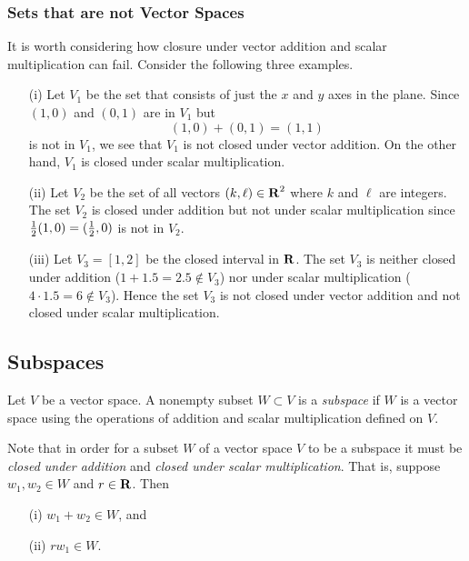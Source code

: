 \documentclass{ximera}
\begin{document}
\subsubsection*{Sets that are not Vector Spaces}

It is worth considering how closure under vector addition and
scalar multiplication can fail.  Consider the following three
examples.

\begin{enumerate}
\item[(i)] Let $V_1$ be the set that consists of just the $x$
and $y$ axes in the plane.  Since $(1,0)$ and $(0,1)$ are in
$V_1$ but
\[
(1,0) + (0,1) = (1,1)
\]
is not in $V_1$, we see that $V_1$ is not closed under vector
addition. On the other hand, $V_1$ is closed under scalar
multiplication.  


\item[(ii)] Let $V_2$ be the set of all vectors $(k,\ell)\in\mbox{$\bf{R}$}^2$
where $k$ and $\ell$ are integers.  The set $V_2$ is closed under
addition but not under scalar multiplication since
$\mbox{$\frac{1}{2}$}(1,0)=(\mbox{$\frac{1}{2}$},0)$ is not in $V_2$.

\item[(iii)] Let $V_3=[1,2]$ be the closed interval in $\mbox{$\bf{R}$}$. The
set $V_3$ is neither closed under addition ($1+1.5=2.5\not\in
V_3$) nor under scalar multiplication ($4\cdot 1.5 = 6\not\in
V_3$).  Hence the set $V_3$ is not closed under vector addition
and not closed under scalar multiplication.
\end{enumerate}

\subsection*{Subspaces}

\begin{Def} \label{subspaces}
Let $V$ be a vector space.  A nonempty subset $W\subset V$ is a
{\em subspace\/} if $W$ is a vector space using the operations of 
addition and scalar multiplication defined on $V$.
\end{Def} 

Note that in order for a subset $W$ of a vector space $V$ to be a 
subspace it must be {\em closed under addition\/} and {\em closed under
scalar multiplication\/}.  That is, suppose $w_1,w_2\in W$ and 
$r\in\mbox{$\bf{R}$}$.  Then
\begin{itemize}
\item[(i)]  $w_1+w_2 \in W$, and
\item[(ii)]  $rw_1\in W$.
\end{itemize}
 
\end{document}
